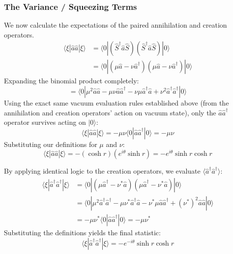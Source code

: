\subsubsection{The Variance / Squeezing Terms}
We now calculate the expectations of the paired annihilation and creation operators.
\begin{align*}
\langle \xi | \hat{a}\hat{a} | \xi \rangle &= \langle 0 | (\hat{S}^\dagger \hat{a} \hat{S}) (\hat{S}^\dagger \hat{a} \hat{S}) | 0 \rangle \\
&= \langle 0 | (\mu\hat{a} - \nu\hat{a}^\dagger)(\mu\hat{a} - \nu\hat{a}^\dagger) | 0 \rangle
\end{align*}
Expanding the binomial product completely:
\begin{equation*}
= \langle 0 | \mu^2 \hat{a}\hat{a} - \mu\nu \hat{a}\hat{a}^\dagger - \nu\mu \hat{a}^\dagger\hat{a} + \nu^2 \hat{a}^\dagger\hat{a}^\dagger | 0 \rangle
\end{equation*}
Using the exact same vacuum evaluation rules established above (from the annihilation and creation operators' action on vacuum state), only the $\hat{a}\hat{a}^\dagger$ operator survives acting on $|0\rangle$:
\begin{equation*}
\langle \xi | \hat{a}\hat{a} | \xi \rangle = -\mu\nu \langle 0 | \hat{a}\hat{a}^\dagger | 0 \rangle = -\mu\nu
\end{equation*}
Substituting our definitions for $\mu$ and $\nu$:
\begin{equation}
\langle \xi | \hat{a}\hat{a} | \xi \rangle = -(\cosh r)(e^{i\theta}\sinh r) = -e^{i\theta}\sinh r \cosh r
\end{equation}

By applying identical logic to the creation operators, we evaluate $\langle \hat{a}^\dagger\hat{a}^\dagger \rangle$:
\begin{align*}
\langle \xi | \hat{a}^\dagger\hat{a}^\dagger | \xi \rangle &= \langle 0 | (\mu\hat{a}^\dagger - \nu^*\hat{a})(\mu\hat{a}^\dagger - \nu^*\hat{a}) | 0 \rangle \\
&= \langle 0 | \mu^2 \hat{a}^\dagger\hat{a}^\dagger - \mu\nu^* \hat{a}^\dagger\hat{a} - \nu^*\mu \hat{a}\hat{a}^\dagger + (\nu^*)^2 \hat{a}\hat{a} | 0 \rangle \\
&= -\mu\nu^* \langle 0 | \hat{a}\hat{a}^\dagger | 0 \rangle = -\mu\nu^*
\end{align*}
Substituting the definitions yields the final statistic:
\begin{equation}
\langle \xi | \hat{a}^\dagger\hat{a}^\dagger | \xi \rangle = -e^{-i\theta}\sinh r \cosh r
\end{equation}




